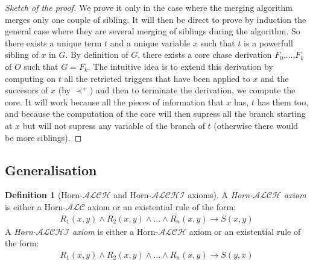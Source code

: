 \documentclass{article}
\theoremstyle{definition}
\newtheorem{definition}{Definition}[section]
\newtheorem{theorem}{Theorem}[section]
\theoremstyle{remark}
\begin{document}
\begin{proof}[Sketch of the proof]
We prove it only in the case where the merging algorithm merges only one couple of sibling. It will then be direct to prove by induction the general case where they are several merging of siblings during the algorithm.
So there exists a unique term $t$ and a unique variable $x$ such that $t$ is a powerfull sibling of $x$ in $G$. By definition of $G$, there exists a core chase derivation $F_0$,...,$F_k$ of $O$ such that $G = F_k$. The intuitive idea is to extend this derivation by computing on $t$ all the retricted triggers that have been applied to $x$ and the succesors of $x$ (by $\prec^+$) and then to terminate the derivation, we compute the core. It will work because all the pieces of information that $x$ has, $t$ has them too, and because the computation of the core will then supress all the branch starting at $x$ but will not supress any variable of the branch of $t$ (otherwise there would be more siblings).
\end{proof} 

%

\subsection{Generalisation}

\begin{definition}[Horn-$\mathcal{ALCH}$ and Horn-$\mathcal{ALCHI}$ axioms]
A \emph{Horn-$\mathcal{ALCH}$ axiom} is either a Horn-$\mathcal{ALC}$ axiom or an existential rule of the form:
\begin{align}
R_1(x,y) \wedge R_2(x,y) \wedge ... \wedge R_n(x,y) \rightarrow S(x,y)
\end{align}
A \emph{Horn-$\mathcal{ALCHI}$ axiom} is either a Horn-$\mathcal{ALCH}$ axiom or an existential rule of the form:
\begin{align}
R_1(x,y) \wedge R_2(x,y) \wedge ... \wedge R_n(x,y) \rightarrow S(y,x)
\end{align}

\end{definition}
\end{document}
